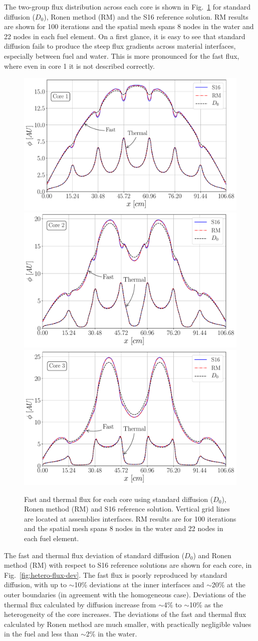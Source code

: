 The two-group flux distribution across each core is shown in Fig.~\ref{fig:hetero-flux} for standard diffusion ($D_0$), Ronen method (RM) and the S16 reference solution. RM results are shown for 100 iterations and the spatial mesh spans 8 nodes in the water and 22 nodes in each fuel element. On a first glance, it is easy to see that standard diffusion fails to produce the steep flux gradients across material interfaces, especially between fuel and water. This is more pronounced for the fast flux, where even in core 1 it is not described correctly. 
%
\begin{figure}[htbp!]
	\centering
	\includegraphics[width=0.49\linewidth]{Sn_Diff_RM_core_1.pdf}
	\includegraphics[width=0.49\linewidth]{Sn_Diff_RM_core_2.pdf}
	\includegraphics[width=0.49\linewidth]{Sn_Diff_RM_core_3.pdf}
	\caption{Fast and thermal flux for each core using standard diffusion ($D_0$), Ronen method (RM) and S16 reference solution. Vertical grid lines are located at assemblies interfaces. RM results are for 100 iterations and the spatial mesh spans 8 nodes in the water and 22 nodes in each fuel element.}
	\label{fig:hetero-flux}
\end{figure}

The fast and thermal flux deviation of standard diffusion ($D_0$) and Ronen method (RM) with respect to S16 reference solutions are shown for each core, in Fig.~\ref{fig:hetero-flux-dev}. The fast flux is poorly reproduced by standard diffusion, with up to $\sim$10\% deviations at the inner interfaces and $\sim$20\% at the outer boundaries (in agreement with the homogeneous case). Deviations of the thermal flux calculated by diffusion increase from $\sim$4\% to $\sim$10\% as the heterogeneity of the core increases. The deviations of the fast and thermal flux calculated by Ronen method are much smaller, with practically negligible values in the fuel and less than $\sim$2\% in the water. 

